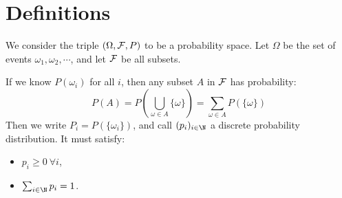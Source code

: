 \documentclass[../Main.tex]{subfiles}
\begin{document}
\section{Definitions}
We consider the triple $(\Omega, \mathcal{F}, P)$ to be a probability space. Let $\Omega$ be the set of events $\omega_1, \omega_2, \cdots$, and let $\mathcal{F}$ be all subsets.\par
If we know $P(\omega_i)$ for all $i$, then any subset $A$ in $\mathcal{F}$ has probability:
\begin{equation}
    P(A) = P\left(\bigcup_{\omega \in A} \{\omega\}\right) = \sum_{\omega \in A}P(\{\omega\})
    \label{eqnFiniteCountAdd}
\end{equation}
Then we write $P_i = P(\{\omega_i\})$, and call $(p_i)_{i \in \N}$ a discrete probability distribution. It must satisfy:
\begin{itemize}
    \item $p_i \geq 0~\forall i$,
    \item $\sum_{i \in \N} p_i = 1$.
\end{itemize}
\end{document}
